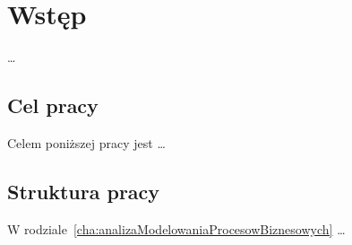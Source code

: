 \chapter{Wstęp}
\label{cha:wstep}

\dots

\section{Cel pracy}
\label{sec:celePracy}

Celem poniższej pracy jest \dots


\section{Struktura pracy}
\label{sec:strukturaPracy}

W rodziale~\ref{cha:analizaModelowaniaProcesowBiznesowych} \dots
